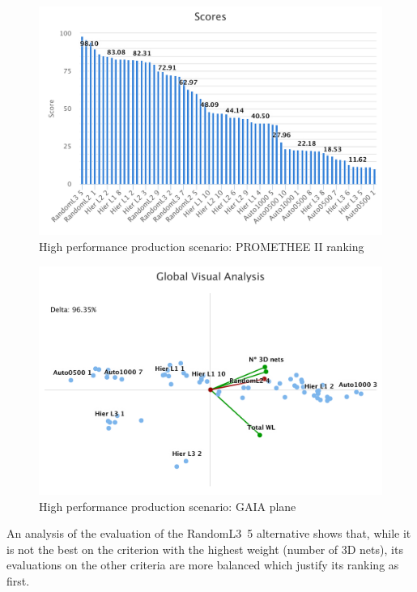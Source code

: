 \documentclass{svmult}
\begin{document}
\begin{figure}[h!]
    \centering
    \includegraphics[width=\linewidth]{rankingperf}
    \caption{High performance production scenario: PROMETHEE II ranking}
    \label{fig:rankingperf}
\end{figure}

\begin{figure}[h!]
    \centering
    \includegraphics[width=\linewidth]{gaiaperf}
    \caption{High performance production scenario: GAIA plane}
    \label{fig:gaiaperf}
\end{figure}

An analysis of the evaluation of the RandomL3~5 alternative shows that, while it is not the best on the criterion with the highest weight (number of 3D nets), its evaluations on the other criteria are more balanced which justify its ranking as first.
\end{document}
